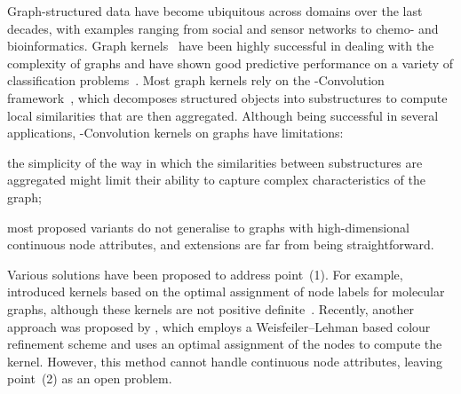\documentclass{article}
\begin{document}
Graph-structured data have become ubiquitous across domains over the last decades, with examples ranging from social and sensor networks to chemo- and bioinformatics. 
Graph kernels~\citep{vishwanathan2010graph} have been highly successful in dealing with the complexity of graphs and have shown good predictive performance on a variety of classification problems~\citep{shervashidze2011weisfeiler,morris2016faster, yanardag2015deep}. 
Most graph kernels rely on the \mbox{-Convolution} framework~\citep{haussler1999convolution}, which decomposes structured objects into substructures to compute local similarities that are then aggregated. Although being successful in several applications, \mbox{-Convolution} kernels on graphs have limitations:
\begin{inparaenum}[(1)]
 \item the simplicity of the way in which the similarities between substructures are aggregated might limit their ability to capture complex characteristics of the graph;
 \item most proposed variants do not generalise to graphs with high-dimensional continuous node attributes, and extensions are far from being straightforward.
\end{inparaenum}
Various solutions have been proposed to address point~(1). For example, \citet{frohlich2005} introduced kernels based on the optimal assignment of node labels for molecular graphs, although these kernels are not positive definite~\citep{vert2008optimal}. Recently, another approach was proposed by \citet{kriege2016oa}, which employs a Weisfeiler--Lehman based colour refinement scheme and uses an optimal assignment of the nodes to compute the kernel. However, this method cannot handle continuous node attributes, leaving point~(2) as an open problem.
 
\end{document}
